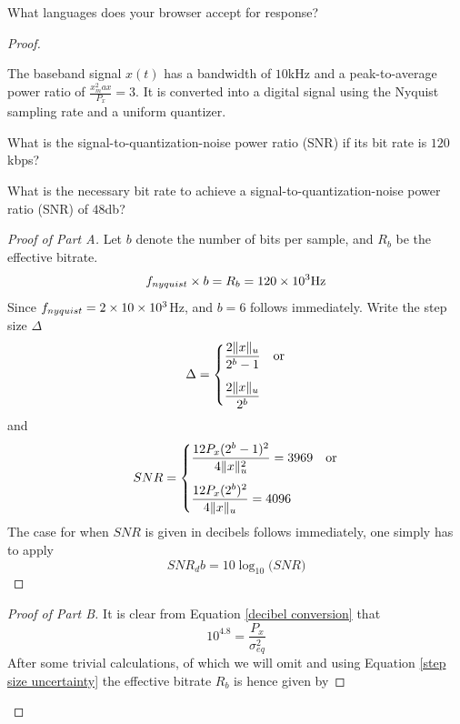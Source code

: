 \documentclass[../../main.tex]{subfiles}
\begin{document}
\begin{wts}
What languages does your browser accept for response?
\end{wts}
\begin{proof}
\begin{wts}
    The baseband signal $x(t)$ has a bandwidth of $10$kHz and a peak-to-average power ratio of $\frac{x^2_max}{P_x}=3$. It is converted into a digital signal using the Nyquist sampling rate and a uniform quantizer.
    \begin{enumalpha}
        \item What is the signal-to-quantization-noise power ratio (SNR) if its bit rate is $120$ kbps?
        \item What is the necessary bit rate to achieve a signal-to-quantization-noise power ratio (SNR) of $48$db?
    \end{enumalpha}
\end{wts}
\begin{proof}[Proof of Part A]
    Let $b$ denote the number of bits per sample, and $R_b$ be the effective bitrate.
    \[f_{nyquist}\times b = R_b = 120\times 10^{3}\mathrm{Hz}\]
    Since $f_{nyquist}=2\times 10\times 10^{3}$Hz, and $b=6$ follows immediately. Write the step size $\Delta$
    \begin{equation}\label{step size uncertainty}
    \Delta = \begin{cases}\dfrac{2\lVert {x} \rVert_u}{2^b-1}&\text{or}\\[3ex]
    \dfrac{2\lVert {x} \rVert_u}{2^b}
    \end{cases}
    \end{equation}
    and
    \[SNR =\begin{cases} \dfrac{12P_x(2^b-1)^2}{4\lVert {x} \rVert_u^2}=3969&\text{or}\\[3ex]
    \dfrac{12P_x(2^b)^2}{4\lVert {x} \rVert_u}=4096
    \end{cases}\]
    The case for when $SNR$ is given in decibels follows immediately, one simply has to apply
    \begin{equation}\label{decibel conversion}
    SNR_db = 10\log_{10}\biggl(SNR\biggr)
    \end{equation}
\end{proof}
\begin{proof}[Proof of Part B]
    It is clear from Equation \eqref{decibel conversion} that 
    \[10^{4.8}=\dfrac{P_x}{\sigma_{eq}^2}\]
    After some trivial calculations, of which we will omit and using Equation \eqref{step size uncertainty} the effective bitrate $R_b$ is hence given by

\end{proof}
\end{proof}
\end{document}
